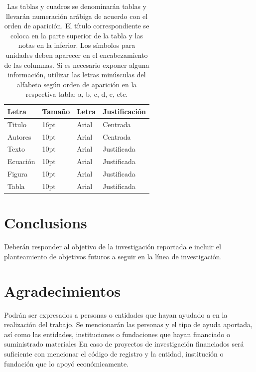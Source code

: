 \documentclass[9pt]{article}
\begin{document}
\begin{table}[H]
\caption{Las tablas y cuadros se denominarán tablas y llevarán numeración arábiga de acuerdo con el orden de aparición. El título correspondiente se coloca en la parte superior de la tabla y las notas en la inferior. Los símbolos para unidades deben aparecer en el encabezamiento de las columnas. Si es necesario exponer alguna información, utilizar las letras minúsculas del alfabeto según orden de aparición en la respectiva tabla: a, b, c, d, e,
etc.}
\begin{tabular}{llll}
\hline
\textbf{Letra} & \textbf{Tamaño} & \textbf{Letra} & \textbf{Justificación} \\ \hline
\rowcolor[HTML]{EFEFEF} 
Titulo         & 16pt            & Arial          & Centrada               \\ \hline
Autores        & 10pt            & Arial          & Centrada               \\ \hline
\rowcolor[HTML]{EFEFEF} 
Texto          & 10pt            & Arial          & Justificada            \\ \hline
Ecuación       & 10pt            & Arial          & Justificada            \\ \hline
\rowcolor[HTML]{EFEFEF} 
Figura         & 10pt            & Arial          & Justificada            \\ \hline
Tabla          & 10pt            & Arial          & Justificada            \\ \hline
\end{tabular}
\label{Tab:Ejemplo_Tabla}
\end{table}


\section*{Conclusions}

Deberán responder al objetivo de la investigación reportada e incluir el planteamiento de objetivos futuros a seguir en la línea de investigación.

\section*{Agradecimientos}

Podrán ser expresados a personas o entidades que hayan ayudado a en la realización del trabajo. Se mencionarán las personas y el tipo de ayuda aportada, así como las entidades, instituciones o fundaciones que hayan financiado o suministrado materiales
En caso de proyectos de investigación financiados será suficiente con mencionar el código de registro y la entidad, institución o fundación que lo apoyó económicamente.
\end{document}
